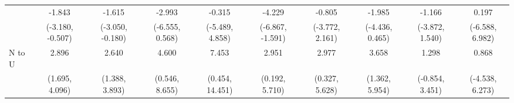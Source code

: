 {\begin{tabular}{l|c|c|c|c|c|c|c|c|c}
& -1.843 & -1.615 & -2.993 & -0.315 & -4.229 & -0.805 & -1.985 & -1.166 & 0.197 \\
& {\scriptsize (-3.180, -0.507)}
& {\scriptsize (-3.050, -0.180)}
& {\scriptsize (-6.555, 0.568)}
& {\scriptsize (-5.489, 4.858)}
& {\scriptsize (-6.867, -1.591)}
& {\scriptsize (-3.772, 2.161)}
& {\scriptsize (-4.436, 0.465)}
& {\scriptsize (-3.872, 1.540)}
& {\scriptsize (-6.588, 6.982)}
\\ [0.1cm]
\hline
N to U
& 2.896 & 2.640 & 4.600 & 7.453 & 2.951 & 2.977 & 3.658 & 1.298 & 0.868 \\
& {\scriptsize (1.695, 4.096)}
& {\scriptsize (1.388, 3.893)}
& {\scriptsize (0.546, 8.655)}
& {\scriptsize (0.454, 14.451)}
& {\scriptsize (0.192, 5.710)}
& {\scriptsize (0.327, 5.628)}
& {\scriptsize (1.362, 5.954)}
& {\scriptsize (-0.854, 3.451)}
& {\scriptsize (-4.538, 6.273)}
\\ [0.1cm]
\hline
\hline
\end{tabular}
}
